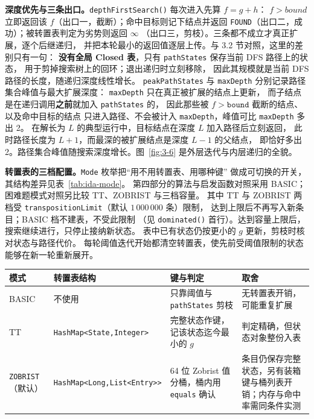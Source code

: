\textbf{深度优先与三条出口。}\texttt{depthFirstSearch()} 每次进入先算 $f=g+h$：
$f>bound$ 立即返回该 $f$（出口一，截断）；命中目标则记下结点并返回
\texttt{FOUND}（出口二，成功）；被转置表判定为劣势则返回 $\infty$
（出口三，剪枝）。三条都不成立才真正扩展，逐个后继递归，
并把本轮最小的返回值逐层上传。与 3.2 节对照，这里的差别只有一句：
\textbf{没有全局 Closed 表}，只有 \texttt{pathStates} 保存当前 DFS 路径上的状态，
用于剪掉搜索树上的回环；退出递归时立刻移除，
因此其规模就是当前 DFS 路径的长度，随递归深度线性增长。
\texttt{peakPathStates} 与 \texttt{maxDepth} 分别记录路径集合峰值与最大扩展深度：
\texttt{maxDepth} 只在真正被扩展的结点上更新，
而子结点是在递归调用\textbf{之前}就加入 \texttt{pathStates} 的，
因此那些被 $f>\texttt{bound}$ 截断的结点、以及命中目标的结点
只进入路径、不会被计入 \texttt{maxDepth}，峰值可比 \texttt{maxDepth} 多出 2。
在解长为 $L$ 的典型运行中，目标结点在深度 $L$ 加入路径后立刻返回，
此时路径长度为 $L+1$，而最深的被扩展结点是深度 $L-1$ 的父结点，
即恰好多出 2。路径集合峰值随搜索深度增长。图~\ref{fig:3-6} 是外层迭代与内层递归的全貌。


\textbf{转置表的三档配置。}\texttt{Mode} 枚举把“用不用转置表、用哪种键”
做成可切换的开关，其结构差异见表~\ref{tab:ida-mode}。
第四部分的算法与启发函数对照采用 BASIC；困难题模式对照另比较 TT、ZOBRIST 与三档容量。
其中 TT 与 ZOBRIST 两档受 \texttt{transpositionLimit}（默认 $1\,000\,000$ 条）限制，
达到上限后不再写入新条目；BASIC 档不建表，不受此限制
（见 \texttt{dominated()} 首行）。达到容量上限后，搜索继续进行，只停止接纳新状态。
表中已有状态仍按更小的 $g$ 更新，剪枝时核对状态与路径代价。
每轮阈值迭代开始都清空转置表，使先前受阈值限制的状态能够在新一轮重新展开。

\par\noindent\begin{minipage}{\linewidth}
\label{tab:ida-mode}
\begin{center}
{\fontsize{9bp}{12bp}\selectfont
\setlength{\tabcolsep}{4bp}
\begin{tabular}{p{54bp}p{112bp}p{112bp}p{100bp}}
\toprule
\textbf{模式} & \textbf{转置表结构} & \textbf{键与判定} & \textbf{取舍} \\
\midrule
BASIC & 不使用 & 只靠阈值与 \texttt{pathStates} 剪枝 & 无转置表开销，可能重复扩展 \\
TT & \texttt{HashMap\textless State,Integer\textgreater} & 完整状态作键，记该状态迄今最小的 $g$ & 判定精确，但状态对象整份入表 \\
\texttt{ZOBRIST}\newline（默认） & \texttt{HashMap\textless Long,}\newline\texttt{List\textless Entry\textgreater\textgreater} & 64 位 Zobrist 值分桶，桶内用 \texttt{equals} 确认 & 条目仍保存完整状态，另有装箱键与桶列表开销；内存与命中率需同条件实测 \\
\bottomrule
\end{tabular}}
\end{center}
\end{minipage}\par

